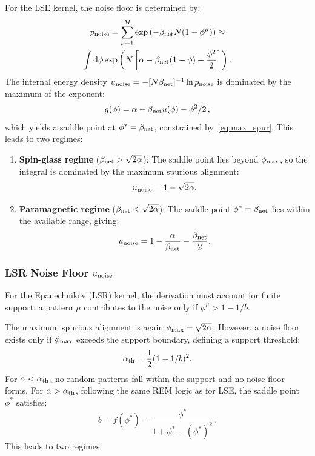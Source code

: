 \documentclass{article}
\newcommand{\dd}{{\mathrm{d}}}
\theoremstyle{plain}
\theoremstyle{definition}
\theoremstyle{remark}
\begin{document}
For the LSE kernel, the noise floor is determined by:
\begin{multline}
    p_{\rm noise} = \sum_{\mu=1}^{M} \exp\left( -\beta_{\rm net} N (1 - \phi^\mu) \right) \approx \\
    \int \dd\phi \exp\left( N \left[ \alpha - \beta_{\rm net}(1 - \phi) - \frac{\phi^2}{2} \right] \right).
\end{multline}
The internal energy density $u_{\rm noise} = -[N\beta_{\rm net}]^{-1} \ln p_{\rm noise}$ is dominated by the maximum of the exponent:
\begin{equation}
    g(\phi) = \alpha - \beta_{\rm net} u(\phi) - \phi^2/2\,,
    \label{eq:g_phi}
\end{equation}
which yields a saddle point at $\phi^* = \beta_{\rm net}$, constrained by~\eqref{eq:max_spur}. This leads to two regimes:

\begin{enumerate}
    \item \textbf{Spin-glass regime} ($\beta_{\rm net} > \sqrt{2\alpha}$): The saddle point lies beyond $\phi_{\rm max}$, so the integral is dominated by the maximum spurious alignment:
    \begin{equation}
        u_{\rm noise} = 1 - \sqrt{2\alpha}.
    \end{equation}
    
    \item \textbf{Paramagnetic regime} ($\beta_{\rm net} < \sqrt{2\alpha}$): The saddle point $\phi^* = \beta_{\rm net}$ lies within the available range, giving:
    \begin{equation}
        u_{\rm noise} = 1 - \frac{\alpha}{\beta_{\rm net}} - \frac{\beta_{\rm net}}{2}.
    \end{equation}
\end{enumerate}


\subsubsection{LSR Noise Floor $u_{\rm noise}$}
For the Epanechnikov (LSR) kernel, the derivation must account for finite support: a pattern $\mu$ contributes to the noise only if $\phi^\mu > 1 - 1/b$.

The maximum spurious alignment is again $\phi_{\rm max} = \sqrt{2\alpha}$. However, a noise floor exists only if $\phi_{\rm max}$ exceeds the support boundary, defining a support threshold:
\begin{equation}
    \alpha_{\rm th} = \frac{1}{2} (1 - 1/b)^2 .
    \label{eq:alpha_th}
\end{equation}
For $\alpha < \alpha_{\rm th}$, no random patterns fall within the support and no noise floor forms. For $\alpha > \alpha_{\rm th}$, following the same REM logic as for LSE, the saddle point $\phi^*$ satisfies:
\begin{equation}
    b = f(\phi^*) = \frac{\phi^*}{1 + \phi^* - (\phi^*)^2}\,.
\end{equation}
This leads to two regimes:
\end{document}
